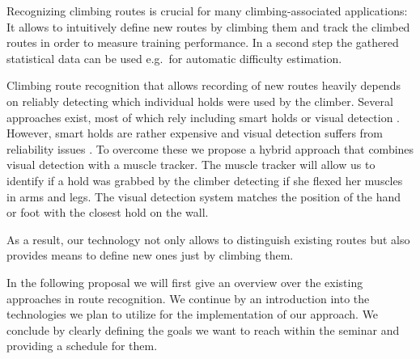 Recognizing climbing routes is crucial for many climbing-associated applications:
It allows to intuitively define new routes by climbing them and track the climbed routes in order to measure training performance.
In a second step the gathered statistical data can be used e.g.\ for automatic difficulty estimation.

Climbing route recognition that allows recording of new routes heavily depends on reliably detecting which individual holds were used by the climber.
Several approaches exist, most of which rely including smart holds \cite{Kistler:Online, Lechner:Online} or visual detection \cite{pub8245, Wiehr:2016:BET:2851581.2892393, Kajastila:2014:ACI:2611780.2581139, Kajastila:2014:ACI:2559206.2581139}.
However, smart holds are rather expensive and visual detection suffers from reliability issues \cite{pub8245, Wiehr:2016:BET:2851581.2892393, Kajastila:2014:ACI:2611780.2581139, Kajastila:2014:ACI:2559206.2581139}.
To overcome these we propose a hybrid approach that combines visual detection with a muscle tracker.
The muscle tracker will allow us to identify if a hold was grabbed by the climber detecting if she flexed her muscles in arms and legs.
The visual detection system matches the position of the hand or foot with the closest hold on the wall.

As a result, our technology not only allows to distinguish existing routes but also provides means to define new ones just by climbing them.

In the following proposal we will first give an overview over the existing approaches in route recognition.
We continue by an introduction into the technologies we plan to utilize for the implementation of our approach.
We conclude by clearly defining the goals we want to reach within the seminar and providing a schedule for them.
